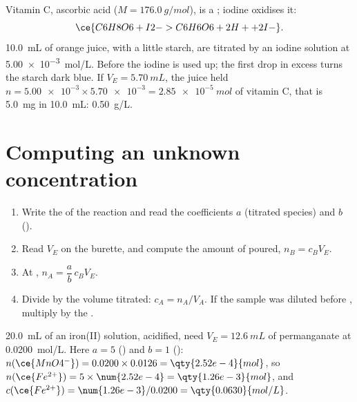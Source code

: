 \begin{example}\label{ex:g11:titration:vitamin-c}
Vitamin C, ascorbic acid  ($M = \qty{176.0}{g/mol}$), is a
; iodine  oxidises it:
\[
  \ce{C6H8O6 + I2 -> C6H6O6 + 2H+ + 2I-} .
\]
\qty{10.0}{mL} of orange juice, with a little starch, are titrated by an
iodine solution at \qty{5.00e-3}{mol/L}. Before  the iodine is
used up; the first drop in excess turns the starch dark blue. If
$V_E = \qty{5.70}{mL}$, the juice held
$n = \num{5.00e-3} \times \num{5.70e-3} = \qty{2.85e-5}{mol}$ of vitamin
C, that is \qty{5.0}{mg} in \qty{10.0}{mL}: \qty{0.50}{g/L}.
\end{example}

\section{Computing an unknown concentration}

\begin{method}\label{met:g11:titration:computing}
\begin{enumerate}
  \item Write the  of the  reaction and read
        the coefficients $a$ (titrated species) and $b$ ().
  \item Read $V_E$ on the burette, and compute the amount of 
        poured, $n_B = c_B V_E$.
  \item At , $n_A = \dfrac{a}{b}\, c_B V_E$.
  \item Divide by the volume titrated: $c_A = n_A / V_A$. If the sample
        was diluted before , multiply by the .
\end{enumerate}
\end{method}

\begin{example}\label{ex:g11:titration:iron}
\qty{20.0}{mL} of an iron(II) solution, acidified, need
$V_E = \qty{12.6}{mL}$ of permanganate at \qty{0.0200}{mol/L}. Here
$a = 5$ () and $b = 1$ ():
$n(\ce{MnO4^-}) = 0.0200 \times 0.0126 = \qty{2.52e-4}{mol}$, so
$n(\ce{Fe^{2+}}) = 5 \times \num{2.52e-4} = \qty{1.26e-3}{mol}$, and
$c(\ce{Fe^{2+}}) = \num{1.26e-3} / 0.0200 = \qty{0.0630}{mol/L}$.
\end{example}

